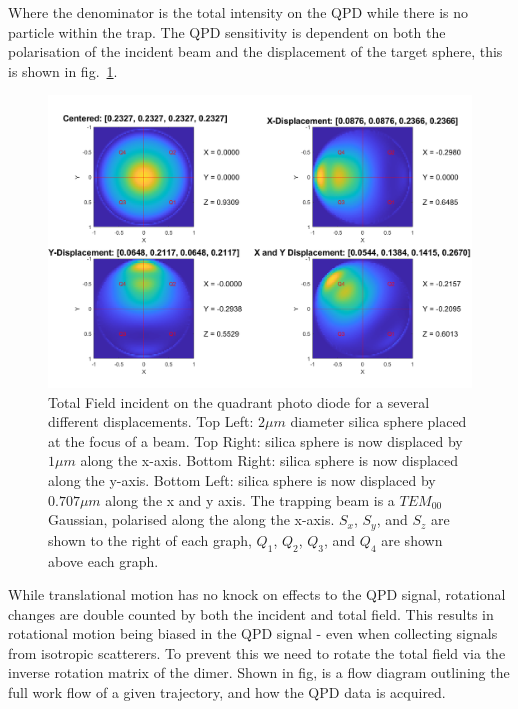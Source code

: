 Where the denominator is the total intensity on the QPD while there is 
no particle within the trap. The QPD sensitivity is dependent on both 
the polarisation of the incident beam and the displacement of the target 
sphere, this is shown in fig.~\ref{fig:totalfield}.
\begin{figure}[h!]
	\centering
	\includegraphics[width=0.7\linewidth]{fixed_polarisation.png}
	\caption{Total Field incident on the quadrant photo diode for a several
		different displacements. Top Left: $2\mu m$ diameter silica sphere
		placed at the focus of a  beam. Top Right: silica sphere is now
		displaced by $1 \mu m$ along the x-axis. Bottom Right: silica sphere 
		is now displaced along the y-axis. Bottom Left: silica sphere is 
		now displaced by $0.707 \mu m$ along the x and y axis. The 
		trapping beam is a $TEM_{00}$ Gaussian, polarised along the along 
		the x-axis. $S_x$, $S_y$, and $S_z$ are shown to the right of each graph, $Q_1$, $Q_2$, $Q_3$, and $Q_4$ are shown above each graph.}
	\label{fig:totalfield}
\end{figure}

While translational motion has no knock on effects to the QPD signal, 
rotational changes are double counted by both the incident and total 
field. This results in rotational motion being biased in the QPD signal 
- even when collecting signals from isotropic scatterers. To prevent 
this we need to rotate the total field via the inverse rotation matrix
of the dimer. Shown in fig, is a flow diagram outlining the full work
flow of a given trajectory, and how the QPD data is acquired. 


